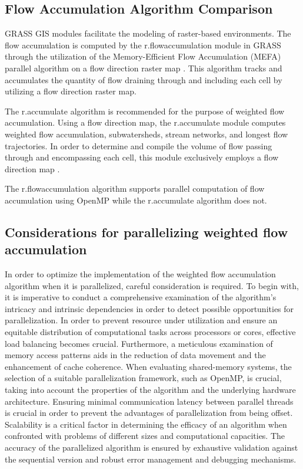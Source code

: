 \documentclass[journal, a4paper]{IEEEtran}
\begin{document}
	\subsection{Flow Accumulation Algorithm Comparison }
	
	GRASS GIS modules facilitate the modeling of raster-based environments. The flow accumulation is computed by the r.flowaccumulation module in GRASS through the utilization of the Memory-Efficient Flow Accumulation (MEFA) parallel algorithm on a flow direction raster map \cite{CHO2023105771, r.flowaccumulation}. This algorithm tracks and accumulates the quantity of flow draining through and including each cell by utilizing a flow direction raster map.

	The r.accumulate algorithm is recommended for the purpose of weighted flow accumulation. Using a flow direction map, the r.accumulate module computes weighted flow accumulation, subwatersheds, stream networks, and longest flow trajectories. In order to determine and compile the volume of flow passing through and encompassing each cell, this module exclusively employs a flow direction map \cite{CHO2020104774, r.accumulate}.
	
	The r.flowaccumulation algorithm  supports parallel computation of flow accumulation using OpenMP while the r.accumulate algorithm does not. 
	

	\subsection{Considerations for parallelizing weighted flow accumulation}
	 
	In order to optimize the implementation of the weighted flow accumulation algorithm when it is parallelized, careful consideration is required. To begin with, it is imperative to conduct a comprehensive examination of the algorithm's intricacy and intrinsic dependencies in order to detect possible opportunities for parallelization. In order to prevent resource under utilization and ensure an equitable distribution of computational tasks across processors or cores, effective load balancing becomes crucial. Furthermore, a meticulous examination of memory access patterns aids in the reduction of data movement and the enhancement of cache coherence. When evaluating shared-memory systems, the selection of a suitable parallelization framework, such as OpenMP, is crucial, taking into account the properties of the algorithm and the underlying hardware architecture. Ensuring minimal communication latency between parallel threads is crucial in order to prevent the advantages of parallelization from being offset. Scalability is a critical factor in determining the efficacy of an algorithm when confronted with problems of different sizes and computational capacities. The accuracy of the parallelized algorithm is ensured by exhaustive validation against the sequential version and robust error management and debugging mechanisms.  
	 
\end{document}
